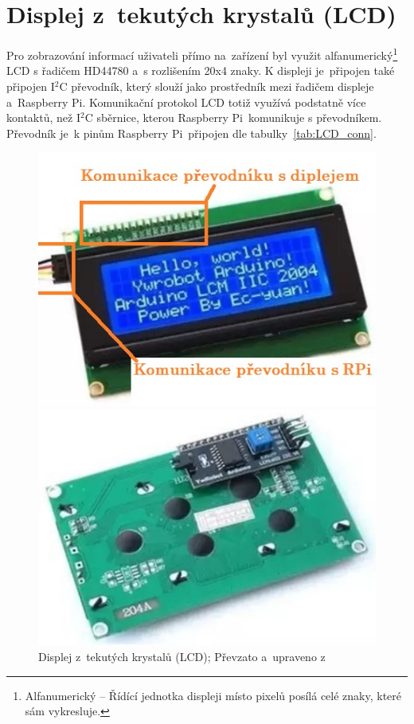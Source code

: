 \section{Displej z~tekutých krystalů (LCD)}
Pro zobrazování informací uživateli přímo na~zařízení byl využit alfanumerický\footnote{Alfanumerický -- Řídící jednotka displeji místo pixelů posílá celé znaky, které sám vykresluje.} LCD s řadičem HD44780 a~s rozlišením 20x4 znaky. K displeji je~připojen také připojen I$^{2}$C převodník, který slouží jako prostředník mezi řadičem displeje a~Raspberry Pi. Komunikační protokol LCD totiž využívá podstatně více kontaktů, než I$^{2}$C sběrnice, kterou Raspberry Pi~komunikuje s převodníkem. Převodník je~k pinům Raspberry Pi~připojen dle tabulky~\ref{tab:LCD_conn}.

\begin{figure}[htb]
  \centering
  \begin{minipage}{0.45\textwidth}
    \centering
    \includegraphics[width=1\textwidth]{img/LCD_front.jpg} %
    \caption{\label{fig:LCD_front} Displej z~tekutých krystalů (LCD); Převzato a~upraveno z~\cite{laskakit-LCD}}
  \end{minipage}\hfill
  \begin{minipage}{0.45\textwidth}
    \centering
    \includegraphics[width=1\textwidth]{img/LCD_back.jpg} %

\end{minipage}
\end{figure}
